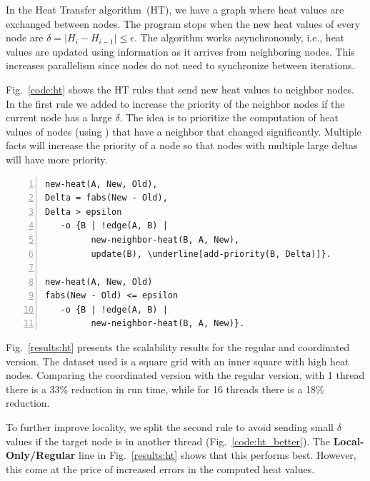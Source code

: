 In the Heat Transfer algorithm~(HT), we have a graph where heat values
are exchanged between nodes. The program stops when the new heat
values of every node are $\delta = |H_i - H_{i-1}| \le \epsilon$. The
algorithm works asynchronously, i.e., heat values are updated using
information as it arrives from neighboring nodes. This increases
parallelism since nodes do not need to synchronize between iterations.

Fig.~\ref{code:ht} shows the HT rules that send new heat values to
neighbor nodes. In the first rule we added  to increase the priority of the neighbor
nodes if the current node has a large $\delta$. The idea is to prioritize the
computation of heat values of nodes (using ) that have a neighbor
that changed significantly. Multiple  facts will
increase the priority of a node so that nodes with multiple large deltas will
have more priority.

\begin{topfig}
\scriptsize\begin{Verbatim}[numbers=left,xleftmargin=7mm,commandchars=\\\[\]]
new-heat(A, New, Old),
Delta = fabs(New - Old),
Delta > epsilon
   -o {B | !edge(A, B) |
         new-neighbor-heat(B, A, New),
         update(B), \underline[add-priority(B, Delta)]}.

new-heat(A, New, Old)
fabs(New - Old) <= epsilon
   -o {B | !edge(A, B) |
         new-neighbor-heat(B, A, New)}.
\end{Verbatim}
\end{topfig}
\normalsize

Fig.~\ref{results:ht} presents the scalability results for the regular
and coordinated version. The dataset used is a square grid with an inner square
with high heat nodes. Comparing the coordinated version with the regular
version, with 1 thread there is a 33\% reduction in run time, while
for 16 threads there is a 18\% reduction.

To further improve locality, we split the second rule to avoid sending
small $\delta$ values if the target node is in another thread
(Fig.~\ref{code:ht_better}). The \textbf{Local-Only/Regular} line in
Fig.~\ref{results:ht} shows that this performs best.
However, this come at the price of increased errors in the computed
heat values.


